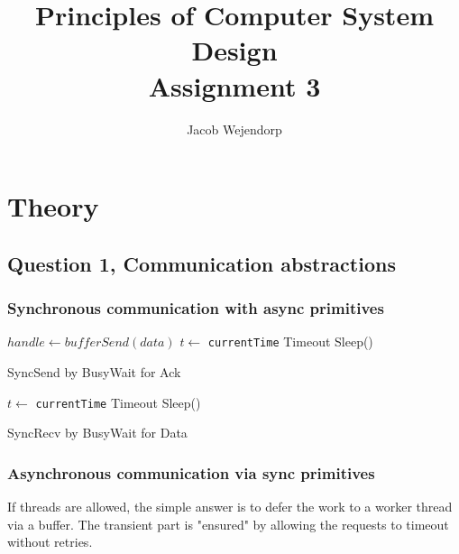 \documentclass[11pt,a4paper]{article}
\title{Principles of Computer System Design\\Assignment 3}
\author{Jacob Wejendorp}
\begin{document}
\maketitle
\section{Theory}
\subsection{Question 1, Communication abstractions}
  \subsubsection{Synchronous communication with async primitives}

\begin{algorithm}[H]
\begin{algorithmic}
  \State $handle \leftarrow bufferSend(data)$
  \State$t \leftarrow$ {\tt currentTime}
      \Return Timeout
    \EndIf
  \State Sleep()
 \EndWhile

\State {}

\end{algorithmic}
	\caption{SyncSend by BusyWait for Ack}
\end{algorithm}

\begin{algorithm}[H]
\begin{algorithmic}
 \State$t \leftarrow$ {\tt currentTime}
      \Return Timeout
    \Else
      \State Sleep()
    \EndIf

 \EndWhile

\State {}

\end{algorithmic}
	\caption{SyncRecv by BusyWait for Data}
\end{algorithm}


\subsubsection{Asynchronous communication via sync primitives}
If threads are allowed, the simple answer is to defer the work to a worker thread via a buffer.
The transient part is "ensured" by allowing the requests to timeout without retries.
\end{document}
